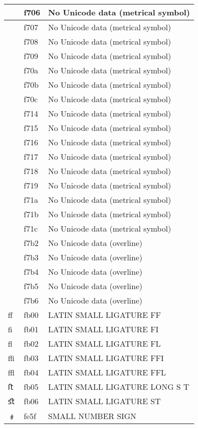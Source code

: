 \documentclass[12pt,letterpaper,openany]{book}
\begin{document}
\begin{center}
\begin{supertabular}{|m{0.25in}|m{0.5in}|m{4in}|}
			 & f706 & No Unicode data (metrical symbol)\\\hline
			 & f707 & No Unicode data (metrical symbol)\\\hline
			 & f708 & No Unicode data (metrical symbol)\\\hline
			 & f709 & No Unicode data (metrical symbol)\\\hline
			 & f70a & No Unicode data (metrical symbol)\\\hline
			 & f70b & No Unicode data (metrical symbol)\\\hline
			 & f70c & No Unicode data (metrical symbol)\\\hline
			 & f714 & No Unicode data (metrical symbol)\\\hline
			 & f715 & No Unicode data (metrical symbol)\\\hline
			 & f716 & No Unicode data (metrical symbol)\\\hline
			 & f717 & No Unicode data (metrical symbol)\\\hline
			 & f718 & No Unicode data (metrical symbol)\\\hline
			 & f719 & No Unicode data (metrical symbol)\\\hline
			 & f71a & No Unicode data (metrical symbol)\\\hline
			 & f71b & No Unicode data (metrical symbol)\\\hline
			 & f71c & No Unicode data (metrical symbol)\\\hline
			 & f7b2 & No Unicode data (overline)\\\hline
			 & f7b3 & No Unicode data (overline)\\\hline
			 & f7b4 & No Unicode data (overline)\\\hline
			 & f7b5 & No Unicode data (overline)\\\hline
			 & f7b6 & No Unicode data (overline)\\\hline
			ﬀ & fb00 & LATIN SMALL LIGATURE FF\\\hline
			ﬁ & fb01 & LATIN SMALL LIGATURE FI\\\hline
			ﬂ & fb02 & LATIN SMALL LIGATURE FL\\\hline
			ﬃ & fb03 & LATIN SMALL LIGATURE FFI\\\hline
			ﬄ & fb04 & LATIN SMALL LIGATURE FFL\\\hline
			ﬅ & fb05 & LATIN SMALL LIGATURE LONG S T\\\hline
			ﬆ & fb06 & LATIN SMALL LIGATURE ST\\\hline
			﹟ & fe5f & SMALL NUMBER SIGN\\\hline

\end{supertabular}
\end{center}
\end{document}
